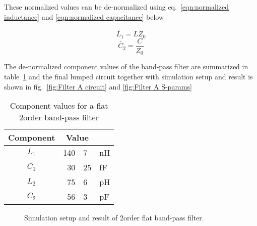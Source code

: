 \documentclass[report.tex]{subfiles}
\begin{document}
These normalized values can be de-normalized using eq.~\ref{eqn:normalized inductance} and \ref{eqn:normalized capacitance} below

\begin{equation}
    \label{eqn:normalized inductance}
    \tilde{L_1}=L Z_0
\end{equation}
\begin{equation}
    \label{eqn:normalized capacitance}
    \tilde{C_2}=\frac{C}{Z_0}
\end{equation}

The de-normalized component values of the band-pass filter are summarized in table~\ref{table:filter values} and the final lumped circuit together with simulation setup and result is shown in fig.~\ref{fig:Filter A circuit} and \ref{fig:Filter A S-params}

\begin{table}[h]
    \centering
    \caption{Component values for a flat 2\nd order band-pass filter}
    \begin{tabular}{c | r @{.} l @{} l}
        Component & \multicolumn{2}{c}{Value} \\
        \hline
        $L_1$     & 140&7 & nH\\
        $C_1$     & 30&25 & fF\\
        $L_2$     & 75&6  & pH\\
        $C_2$     & 56&3  & pF\\
    \end{tabular}
    \label{table:filter values}
\end{table}

\clearpage
\begin{figure}[h]
    \centering
    
    \caption{Simulation setup and result of 2\nd order flat band-pass filter.}
\end{figure}
\clearpage
\end{document}
